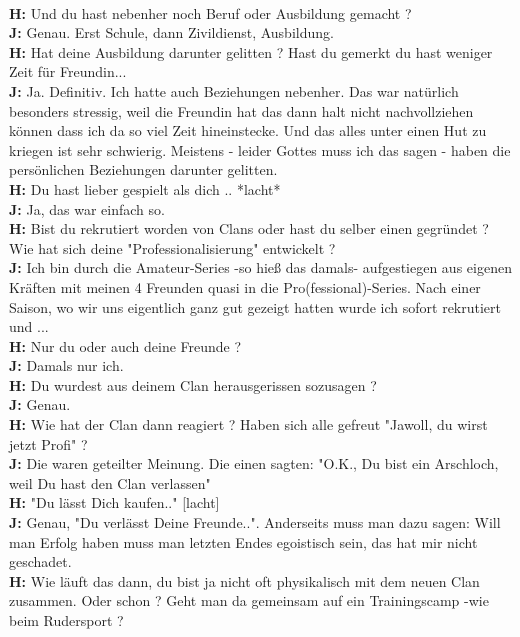 \documentclass[10pt,a4paper,ngerman,twoside]{article} %
\begin{document}
\\ \textbf{H:} Und du hast nebenher noch Beruf oder Ausbildung gemacht ?
\\ \textbf{J:} Genau. Erst Schule, dann Zivildienst, Ausbildung.
\\ \textbf{H:} Hat deine Ausbildung darunter gelitten ? Hast du gemerkt du hast weniger Zeit für Freundin...
\\ \textbf{J:} Ja. Definitiv. Ich hatte auch Beziehungen nebenher. Das war natürlich besonders stressig, weil die Freundin hat das dann halt nicht nachvollziehen können dass ich da so viel Zeit hineinstecke. Und das alles unter einen Hut zu kriegen ist sehr schwierig. Meistens - leider Gottes muss ich das sagen - haben die persönlichen Beziehungen darunter gelitten.
\\ \textbf{H:} Du hast lieber gespielt als dich .. *lacht*
\\ \textbf{J:} Ja, das war einfach so.
\\ \textbf{H:} Bist du rekrutiert worden von Clans oder hast du selber einen gegründet ? Wie hat sich deine "Professionalisierung" entwickelt ?
\\ \textbf{J:} Ich bin durch die Amateur-Series -so hieß das damals- aufgestiegen aus eigenen Kräften mit meinen 4 Freunden quasi in die Pro(fessional)-Series. Nach einer Saison, wo wir uns eigentlich ganz gut gezeigt hatten wurde ich sofort rekrutiert und ...
\\ \textbf{H:} Nur du oder auch deine Freunde ?
\\ \textbf{J:} Damals nur ich.
\\ \textbf{H:} Du wurdest aus deinem Clan herausgerissen sozusagen ?
\\ \textbf{J:} Genau.
\\ \textbf{H:} Wie hat der Clan dann reagiert ? Haben sich alle gefreut "Jawoll, du wirst jetzt Profi" ?
\\ \textbf{J:} Die waren geteilter Meinung. Die einen sagten: "O.K., Du bist ein Arschloch, weil Du hast den Clan verlassen"
\\ \textbf{H:} "Du lässt Dich kaufen.." [lacht]
\\ \textbf{J:} Genau, "Du verlässt Deine Freunde..". Anderseits muss man dazu sagen: Will man Erfolg haben muss man letzten Endes egoistisch sein, das hat mir nicht geschadet.
\\ \textbf{H:} Wie läuft das dann, du bist ja nicht oft physikalisch mit dem neuen Clan zusammen. Oder schon ? Geht man da gemeinsam auf ein Trainingscamp -wie beim Rudersport ?
\end{document}
